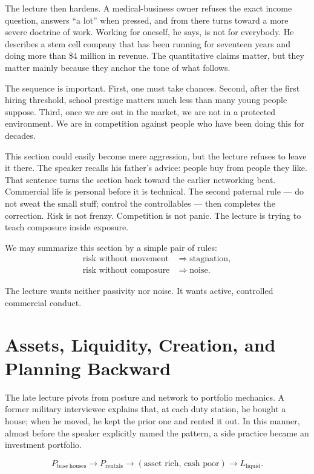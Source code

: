 The lecture then hardens. A medical-business owner refuses the exact income question, answers ``a lot'' when pressed, and from there turns toward a more severe doctrine of work. Working for oneself, he says, is not for everybody. He describes a stem cell company that has been running for seventeen years and doing more than \$4 million in revenue. The quantitative claims matter, but they matter mainly because they anchor the tone of what follows.

The sequence is important. First, one must take chances. Second, after the first hiring threshold, school prestige matters much less than many young people suppose. Third, once we are out in the market, we are not in a protected environment. We are in competition against people who have been doing this for decades.

This section could easily become mere aggression, but the lecture refuses to leave it there. The speaker recalls his father's advice: people buy from people they like. That sentence turns the section back toward the earlier networking beat. Commercial life is personal before it is technical. The second paternal rule --- do not sweat the small stuff; control the controllables --- then completes the correction. Risk is not frenzy. Competition is not panic. The lecture is trying to teach composure inside exposure.

We may summarize this section by a simple pair of rules:
\begin{align}
\text{risk without movement} &\Rightarrow \text{stagnation},\\
\text{risk without composure} &\Rightarrow \text{noise}.
\end{align}

The lecture wants neither passivity nor noise. It wants active, controlled commercial conduct.

\section{Assets, Liquidity, Creation, and Planning Backward}

The late lecture pivots from posture and network to portfolio mechanics. A former military interviewee explains that, at each duty station, he bought a house; when he moved, he kept the prior one and rented it out. In this manner, almost before the speaker explicitly named the pattern, a side practice became an investment portfolio.

\begin{equation}
P_{\mathrm{base\ houses}} \to P_{\mathrm{rentals}} \to (\text{asset rich},\,\text{cash poor}) \to L_{\mathrm{liquid}}.
\end{equation}

